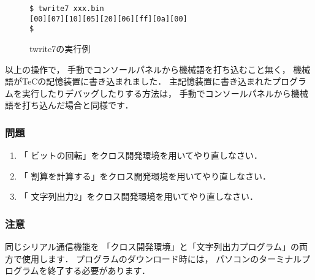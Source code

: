 \begin{figure}[bt]
{\small\begin{lstlisting}[numbers=none]
$ twrite7 xxx.bin
[00][07][10][05][20][06][ff][0a][00]
$
\end{lstlisting}}
\caption{twrite7の実行例}
\label{fig:chap6:twrite7}
\end{figure}

以上の操作で，
手動でコンソールパネルから機械語を打ち込むこと無く，
機械語がTeCの記憶装置に書き込まれました．
主記憶装置に書き込まれたプログラムを実行したりデバッグしたりする方法は，
手動でコンソールパネルから機械語を打ち込んだ場合と同様です．

\newpage
\subsubsection{問題}
\begin{enumerate}
\item 「 ビットの回転」をクロス開発環境を用いてやり直しなさい．
\item 「 割算を計算する」をクロス開発環境を用いてやり直しなさい．
\item 「 文字列出力2」をクロス開発環境を用いてやり直しなさい．
\end{enumerate}

\subsubsection{注意}
同じシリアル通信機能を
「クロス開発環境」と「文字列出力プログラム」の両方で使用します．
プログラムのダウンロード時には，
パソコンのターミナルプログラムを終了する必要があります．


